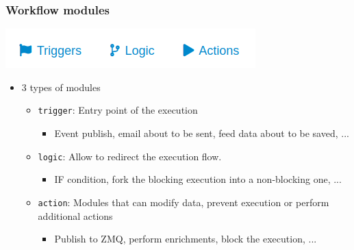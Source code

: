 \begin{frame}
    \frametitle{Workflow modules}
    \begin{center}
        \includegraphics[width=0.5\linewidth]{pictures/module-type.png}
    \end{center}
    \begin{itemize}
        \item 3 types of modules
        \begin{itemize}
            \item \texttt{trigger}: Entry point of the execution
            \begin{itemize}
                \item Event publish, email about to be sent, feed data about to be saved, ...
            \end{itemize}
            \item \texttt{logic}: Allow to redirect the execution flow.
            \begin{itemize}
                \item IF condition, fork the blocking execution into a non-blocking one, ...
            \end{itemize}
            \item \texttt{action}: Modules that can modify data, prevent execution or perform additional actions
            \begin{itemize}
                \item Publish to ZMQ, perform enrichments, block the execution, ...
            \end{itemize}
        \end{itemize}
    \end{itemize}
\end{frame}

